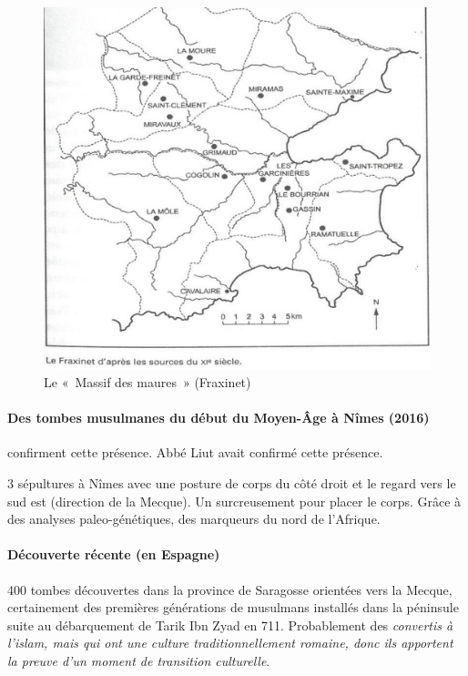 \begin{figure}[h!]
    \centering
    \includegraphics[width=\textwidth]{Images/Fraxinet.png}
    \caption{Le « Massif des maures » (Fraxinet) }
    \label{fig:Fraxinet}
\end{figure}

\paragraph{Des tombes musulmanes du début du Moyen-Âge à Nîmes (2016)} confirment cette présence. Abbé Liut avait confirmé cette présence.

3 sépultures à Nîmes avec une posture de corps du côté droit et le regard vers le sud est (direction de la Mecque). Un surcreusement pour placer le corps. Grâce à des analyses paleo-génétiques, des marqueurs du nord de l'Afrique.

\paragraph{Découverte récente (en Espagne)}

400 tombes découvertes dans la province de Saragosse orientées vers la Mecque, certainement des premières générations de musulmans installés dans la péninsule suite au débarquement de Tarik Ibn Zyad en 711. Probablement des \textit{convertis à l'islam, mais qui ont une culture traditionnellement romaine, donc ils apportent la preuve d'un moment de transition culturelle}.


